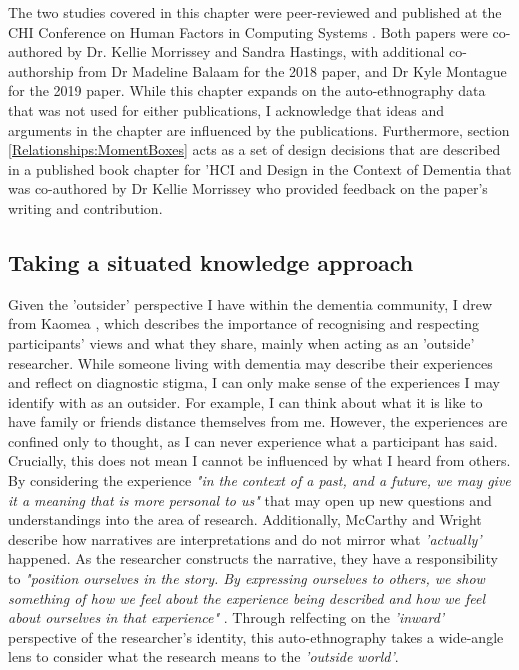 The two studies covered in this chapter were peer-reviewed and published at the CHI Conference on Human Factors in Computing Systems \citep{hodge_exploring_2018,hodge_exploring_2019}. Both papers were co-authored by Dr. Kellie Morrissey and Sandra Hastings, with additional co-authorship from Dr Madeline Balaam for the 2018 paper, and Dr Kyle Montague for the 2019 paper. While this chapter expands on the auto-ethnography data that was not used for either publications, I acknowledge that ideas and arguments in the chapter are influenced by the publications. Furthermore, section \ref{Relationships:MomentBoxes} acts as a set of design decisions that are described in a published book chapter for 'HCI and Design in the Context of Dementia \citep{hodge2020sharing} that was co-authored by Dr Kellie Morrissey who provided feedback on the paper's writing and contribution. 

\subsection{Taking a situated knowledge approach}
\label{Relationships-Intro:SituatedKnowledge}
Given the 'outsider' perspective I have within the dementia community, I drew from Kaomea \citep{kaomea_dilemmas_2001}, which describes the importance of recognising and respecting participants' views and what they share, mainly when acting as an 'outside' researcher. While someone living with dementia may describe their experiences and reflect on diagnostic stigma, I can only make sense of the experiences I may identify with as an outsider. For example, I can think about what it is like to have family or friends distance themselves from me. However, the experiences are confined only to thought, as I can never experience what a participant has said. Crucially, this does not mean I cannot be influenced by what I heard from others. By considering the experience \textit{"in the context of a past, and a future, we may give it a meaning that is more personal to us"} \citep{mccarthy_technology_2007} that may open up new questions and understandings into the area of research. Additionally, McCarthy and Wright describe how narratives are interpretations and do not mirror what \textit{'actually'} happened. As the researcher constructs the narrative, they have a responsibility to \textit{"position ourselves in the story. By expressing ourselves to others, we show something of how we feel about the experience being described and how we feel about ourselves in that experience"} \citep{mccarthy_technology_2007}. Through relfecting on the \textit{'inward'} perspective of the researcher's identity, this auto-ethnography takes a wide-angle lens \citep{ellis_heartful_2016} to consider what the research means to the \textit{'outside world'}.

